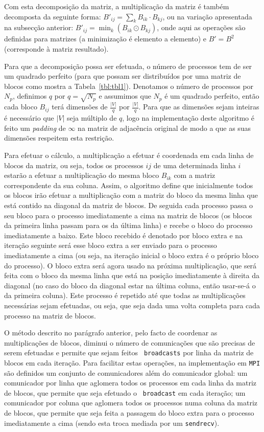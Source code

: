 \documentclass[10pt,a4paper,oneside]{article}
\begin{document}
Com esta decomposição da matriz, a multiplicação da matriz é também
decomposta da seguinte forma: $B'_{ij} = \sum_k{B_{ik} \cdot B_{kj}}$,
ou na variação apresentada na subsecção anterior: $B'_{ij} =
\min_k{(B_{ik} \odot B_{kj})}$, onde aqui as operações são definidas para
matrizes (a minimização é elemento a elemento) e $B' = B^2$
(corresponde à matriz resultado).

Para que a decomposição possa ser efetuada, o número de processos tem
de ser um quadrado perfeito (para que possam ser distribuídos por uma
matriz de blocos como mostra a Tabela~\ref{tbl:tbl1}). Denotamos o
número de processos por $N_p$, definimos $q$ por $q = \sqrt{N_p}$ e
assumimos que $N_p$ é um quadrado perfeito, então cada bloco $B_{ij}$
terá dimensões de $\frac{|V|}{q}$ por $\frac{|V|}{q}$. Para que as
dimensões sejam inteiras é necessário que $|V|$ seja múltiplo de $q$,
logo na implementação deste algoritmo é feito um \textit{padding} de
$\infty$ na matriz de adjacência original de modo a que as suas
dimensões respeitem esta restrição.

Para efetuar o cálculo, a multiplicação a efetuar é coordenada em cada
linha de blocos da matriz, ou seja, todos os processos $ij$ de uma
determinada linha $i$ estarão a efetuar a multiplicação do mesma bloco
$B_{ik}$ com a matriz correspondente da sua coluna. Assim, o algoritmo
define que inicialmente todos os blocos irão efetuar a multiplicação
com a matriz do bloco da mesma linha que está contido na diagonal da
matriz de blocos. De seguida cada processo passa o seu bloco para o
processo imediatamente a cima na matriz de blocos (os blocos da
primeira linha passam para os da última linha) e recebe o bloco do
processo imediatamente a baixo. Este bloco recebido é denotado por
bloco extra e na iteração seguinte será esse bloco extra a ser enviado
para o processo imediatamente a cima (ou seja, na iteração inicial o
bloco extra é o próprio bloco do processo). O bloco extra será agora
usado na próxima multiplicação, que será feita com o bloco da mesma
linha que está na posição imediatamente à direita da diagonal (no caso
do bloco da diagonal estar na última coluna, então usar-se-á o da
primeira coluna). Este processo é repetido até que todas as
multiplicações necessárias sejam efetuadas, ou seja, que seja dada uma
volta completa para cada processo na matriz de blocos.

O método descrito no parágrafo anterior, pelo facto de coordenar as
multiplicações de blocos, diminui o número de comunicações que são
precisas de serem efetuadas e permite que sejam feitos {\tt
  broadcasts} por linha da matriz de blocos em cada iteração. Para
facilitar estas operações, na implementação em {\tt MPI} são definidos
um conjunto de comunicadores além do comunicador global: um
comunicador por linha que aglomera todos os processos em cada
linha da matriz de blocos, que permite que seja efetuado o {\tt
  broadcast} em cada iteração; um comunicador por coluna que aglomera
todos os processos numa coluna da matriz de blocos, que permite
que seja feita a passagem do bloco extra para o processo
imediatamente a cima (sendo esta troca mediada por um {\tt sendrecv}).
\end{document}
